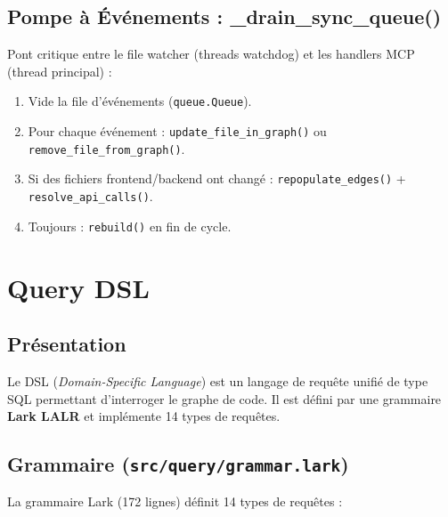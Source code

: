 \documentclass[12pt,a4paper]{article}
\newcommand{\code}[1]{\texttt{#1}}
\begin{document}
\subsection{Pompe à Événements : \_drain\_sync\_queue()}

Pont critique entre le file watcher (threads watchdog) et les handlers MCP (thread principal) :

\begin{enumerate}
    \item Vide la file d'événements (\code{queue.Queue}).
    \item Pour chaque événement : \code{update\_file\_in\_graph()} ou \code{remove\_file\_from\_graph()}.
    \item Si des fichiers frontend/backend ont changé : \code{repopulate\_edges()} + \code{resolve\_api\_calls()}.
    \item Toujours : \code{rebuild()} en fin de cycle.
\end{enumerate}

\section{Query DSL}

\subsection{Présentation}

Le DSL (\textit{Domain-Specific Language}) est un langage de requête unifié de type SQL permettant d'interroger le graphe de code. Il est défini par une grammaire \textbf{Lark LALR} et implémente 14 types de requêtes.

\subsection{Grammaire (\code{src/query/grammar.lark})}

La grammaire Lark (172 lignes) définit 14 types de requêtes :
\end{document}
